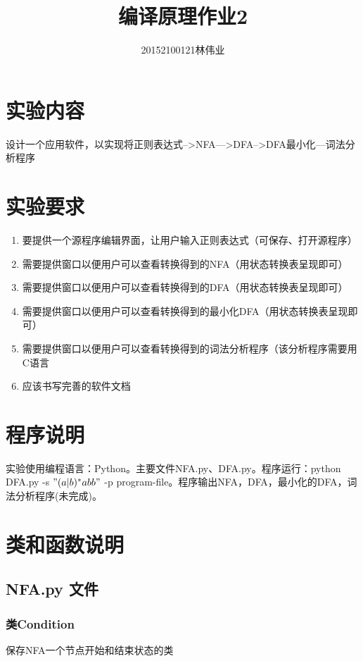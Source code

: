 \documentclass[]{article}
\title{编译原理作业2}
\author{20152100121林伟业}
\date{}
\begin{document}
\maketitle

\section{实验内容}

设计一个应用软件，以实现将正则表达式-->NFA--->DFA-->DFA最小化---词法分析程序

\section{实验要求}

\begin{enumerate}
\item   要提供一个源程序编辑界面，让用户输入正则表达式（可保存、打开源程序）
\item   需要提供窗口以便用户可以查看转换得到的NFA（用状态转换表呈现即可）
\item   需要提供窗口以便用户可以查看转换得到的DFA（用状态转换表呈现即可）
\item   需要提供窗口以便用户可以查看转换得到的最小化DFA（用状态转换表呈现即可）
\item   需要提供窗口以便用户可以查看转换得到的词法分析程序（该分析程序需要用C语言
\item   应该书写完善的软件文档
\end{enumerate}

\section{程序说明}

实验使用编程语言：Python。主要文件NFA.py、DFA.py。程序运行：python DFA.py -s $"(a|b)^*abb"$ -p program-file。程序输出NFA，DFA，最小化的DFA，词法分析程序(未完成)。

\section{类和函数说明}
\subsection{NFA.py 文件} 
\subsubsection*{类Condition}
保存NFA一个节点开始和结束状态的类
\end{document}
